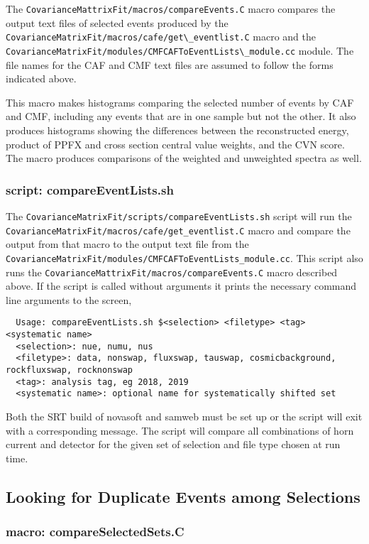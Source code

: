 The \lstinline{CovarianceMattrixFit/macros/compareEvents.C} macro compares the output text files of selected events produced by the \lstinline{CovarianceMatrixFit/macros/cafe/get\_eventlist.C} macro and the \lstinline{CovarianceMatrixFit/modules/CMFCAFToEventLists\_module.cc} module. The file names for the CAF and CMF text files are assumed to follow the forms indicated above.

This macro makes histograms comparing the selected number of events by CAF and CMF, including any events that are in one sample but not the other.  It also produces histograms showing the differences between the reconstructed energy, product of PPFX and cross section central value weights, and the CVN score.  The macro produces comparisons of the weighted and unweighted spectra as well.

\subsubsection{script: compareEventLists.sh}

The \lstinline{CovarianceMatrixFit/scripts/compareEventLists.sh} script will run the \lstinline{CovarianceMatrixFit/macros/cafe/get_eventlist.C} macro and compare the output from that macro to the output text file from the \lstinline{CovarianceMatrixFit/modules/CMFCAFToEventLists_module.cc}.  This script also runs the \lstinline{CovarianceMattrixFit/macros/compareEvents.C} macro described above. If the script is called without arguments it prints the necessary command line arguments to the screen,
\begin{lstlisting}
  Usage: compareEventLists.sh $<selection> <filetype> <tag> <systematic name>
  <selection>: nue, numu, nus
  <filetype>: data, nonswap, fluxswap, tauswap, cosmicbackground, rockfluxswap, rocknonswap
  <tag>: analysis tag, eg 2018, 2019
  <systematic name>: optional name for systematically shifted set
\end{lstlisting}
Both the SRT build of novasoft and samweb must be set up or the script will exit with a corresponding message. The script will compare all combinations of horn current and detector for the given set of selection and file  type chosen at run time.

\subsection{Looking for Duplicate Events among Selections}

\subsubsection{macro: compareSelectedSets.C}

